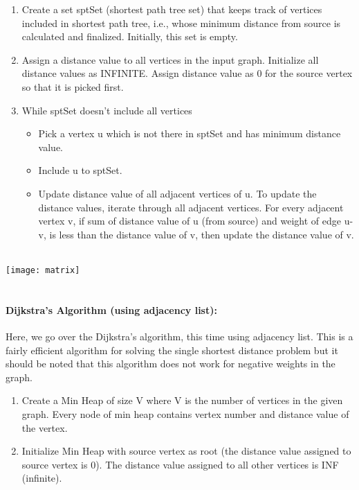 \documentclass[10pt]{article}
\begin{document}
\begin{multicols*}{2}
\begin{enumerate}
    \item Create a set sptSet (shortest path tree set)  that keeps track of vertices included in  
shortest path tree, i.e., whose minimum  distance from source is calculated and 
finalized. Initially, this set is empty. 
\item  Assign a distance value to all vertices in  the input graph. Initialize all distance  
values as INFINITE. Assign distance  value as 0 for the source vertex so that it  is picked first. 
\item While sptSet doesn’t include all vertices 
\begin{itemize}
  \item Pick a vertex u which is not  there in sptSet and has minimum  distance value.
  \item Include u to sptSet. 
  \item Update distance value of all  adjacent vertices of u. To update  the distance values, iterate  through all adjacent vertices. For  every    adjacent vertex v, if sum  of distance value of u (from  source) and weight of edge u-v,  is less than the distance value of  v, then update the distance value  of v. \\\\
\end{itemize}


\end{enumerate}

\texttt{[image: matrix]}\\\\



\paragraph{Dijkstra's Algorithm (using adjacency list):}

Here, we go over the Dijkstra's algorithm, this time using adjacency list. This is a fairly efficient algorithm for solving the single shortest distance problem but it should be noted  that this algorithm does not work for negative weights in the graph. 
\begin{enumerate}

\item Create a Min Heap of size V where V is  the number of vertices in the given graph.  Every node of min heap contains vertex  number and distance value of the vertex. 


\item	Initialize Min Heap with source vertex as  root (the distance value assigned to  source vertex is 0). The distance value  assigned to all other vertices is INF  (infinite). 



\end{enumerate}
\end{multicols*}
\end{document}
